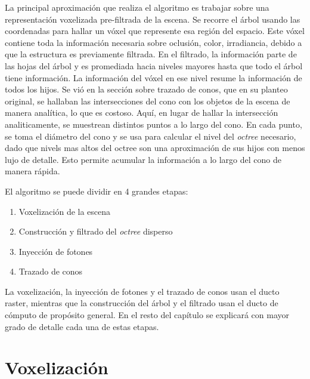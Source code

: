La principal aproximación que realiza el algoritmo es trabajar sobre una representación voxelizada pre-filtrada de la escena.
Se recorre el árbol usando las coordenadas para hallar un vóxel que represente esa región del espacio.
Este vóxel contiene toda la información necesaria sobre oclusión, color, irradiancia, debido a que la estructura es previamente filtrada.
En el filtrado, la información parte de las hojas del árbol y es promediada hacia niveles mayores hasta que todo el árbol tiene información.
La información del vóxel en ese nivel resume la información de todos los hijos.
Se vió en la sección sobre trazado de conos, que en su planteo original, se hallaban las intersecciones del cono con los objetos de la escena de manera analítica, lo que es costoso.
Aquí, en lugar de hallar la intersección analiticamente, se muestrean distintos puntos a lo largo del cono.
En cada punto, se toma el diámetro del cono y se usa para calcular el nivel del \textit{octree} necesario, dado que nivels mas altos del octree son una aproximación de sus hijos con menos lujo de detalle.
Esto permite acumular la información a lo largo del cono de manera rápida.


El algoritmo se puede dividir en 4 grandes etapas:

\begin{enumerate}
    \item Voxelización de la escena
    \item Construcción y filtrado del \textit{octree} disperso
    \item Inyección de fotones
    \item Trazado de conos
\end{enumerate}

La voxelización, la inyección de fotones y el trazado de conos usan el ducto raster, mientras que la construcción del árbol y el filtrado usan el ducto de cómputo de propósito general.
En el resto del capítulo se explicará con mayor grado de detalle cada una de estas etapas.

\section{Voxelización}\label{sec:voxelization}


